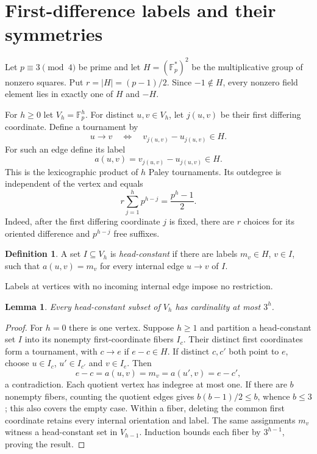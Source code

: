 \documentclass[11pt]{article}
\newtheorem{lemma}[theorem]{Lemma}
\theoremstyle{definition}
\newtheorem{definition}[theorem]{Definition}
\newcommand{\F}{\mathbb F}
\begin{document}
\section{First-difference labels and their symmetries}\label{sec:labels}
Let $p\equiv3\pmod4$ be prime and let $H=(\F_p^*)^2$ be the multiplicative group of nonzero squares. Put $r=|H|=(p-1)/2$. Since $-1\notin H$, every nonzero field element lies in exactly one of $H$ and $-H$.

For $h\ge0$ let $V_h=\F_p^h$. For distinct $u,v\in V_h$, let $j(u,v)$ be their first differing coordinate. Define a tournament by
\[
 u\longrightarrow v
 \quad\Longleftrightarrow\quad
 v_{j(u,v)}-u_{j(u,v)}\in H.
\]
For such an edge define its label
\[
 a(u,v)=v_{j(u,v)}-u_{j(u,v)}\in H.
\]
This is the lexicographic product of $h$ Paley tournaments. Its outdegree is independent of the vertex and equals
\begin{equation}\label{eq:degree}
 r\sum_{j=1}^h p^{h-j}=\frac{p^h-1}{2}.
\end{equation}
Indeed, after the first differing coordinate $j$ is fixed, there are $r$ choices for its oriented difference and $p^{h-j}$ free suffixes.

\begin{definition}
A set $I\subseteq V_h$ is \emph{head-constant} if there are labels $m_v\in H$, $v\in I$, such that $a(u,v)=m_v$ for every internal edge $u\to v$ of $I$.
\end{definition}
Labels at vertices with no incoming internal edge impose no restriction.

\begin{lemma}\label{lem:exclusion}
Every head-constant subset of $V_h$ has cardinality at most $3^h$.
\end{lemma}
\begin{proof}
For $h=0$ there is one vertex. Suppose $h\ge1$ and partition a head-constant set $I$ into its nonempty first-coordinate fibers $I_c$. Their distinct first coordinates form a tournament, with $c\to e$ if $e-c\in H$. If distinct $c,c'$ both point to $e$, choose $u\in I_c$, $u'\in I_{c'}$ and $v\in I_e$. Then
\[
 e-c=a(u,v)=m_v=a(u',v)=e-c',
\]
a contradiction. Each quotient vertex has indegree at most one. If there are $b$ nonempty fibers, counting the quotient edges gives $b(b-1)/2\le b$, whence $b\le3$; this also covers the empty case. Within a fiber, deleting the common first coordinate retains every internal orientation and label. The same assignments $m_v$ witness a head-constant set in $V_{h-1}$. Induction bounds each fiber by $3^{h-1}$, proving the result.
\end{proof}
\end{document}
